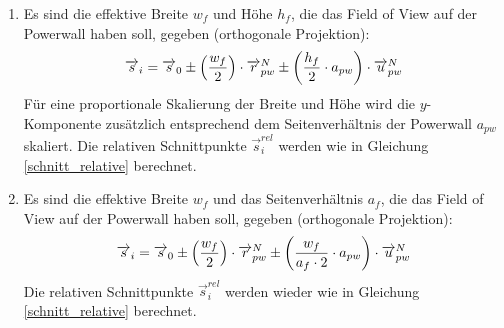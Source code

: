 \documentclass[]{article}
\newcommand{\POW}{Powerwall}
\newcommand{\FOV}{Field of View}
\begin{document}
\begin{enumerate}
    \item Es sind die effektive Breite $w_{f}$ und Höhe $h_{f}$, die das \FOV{} auf der \POW{} haben soll, gegeben (\glqq{}orthogonale Projektion\grqq{}):\\
        \begin{equation}
           \overrightarrow{s}_{i} = \overrightarrow{s}_{0} \pm \left( \frac{w_{f}}{2} \right) \cdot \overrightarrow{r}_{pw}^{N} \pm \left( \frac{h_{f}}{2} \cdot a_{pw} \right) \cdot \overrightarrow{u}_{pw}^{N}\\   
        \end{equation}
        Für eine proportionale Skalierung der Breite und Höhe wird die $y$-Komponente zusätzlich entsprechend dem Seitenverhältnis der \POW{} $a_{pw}$ skaliert.
        Die relativen Schnittpunkte $\overrightarrow{s}_{i}^{rel}$ werden wie in Gleichung \ref{schnitt_relative} berechnet.
        
    \item Es sind die effektive Breite $w_{f}$ und das Seitenverhältnis $a_{f}$, die das \FOV{} auf der \POW{} haben soll, gegeben (\glqq{}orthogonale Projektion\grqq{}):
        \begin{equation}
            \overrightarrow{s}_{i} = \overrightarrow{s}_{0} \pm \left( \frac{w_{f}}{2} \right) \cdot \overrightarrow{r}_{pw}^{N}  \pm \left( \frac{w_{f}}{a_{f} \cdot 2} \cdot a_{pw} \right) \cdot \overrightarrow{u}_{pw}^{N}\\    
        \end{equation}
        Die relativen Schnittpunkte $\overrightarrow{s}_{i}^{rel}$ werden wieder wie in Gleichung \ref{schnitt_relative} berechnet.
            

\end{enumerate}
\end{document}
